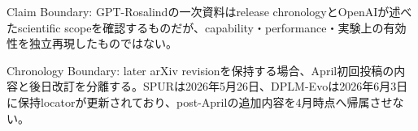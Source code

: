 \begin{claimboundary}
Claim Boundary: GPT-Rosalindの一次資料はrelease chronologyとOpenAIが述べたscientific scopeを確認するものだが、capability・performance・実験上の有効性を独立再現したものではない。\autocite{src-078f0d540d88}
\end{claimboundary}

\begin{claimboundary}
Chronology Boundary: later arXiv revisionを保持する場合、April初回投稿の内容と後日改訂を分離する。SPURは2026年5月26日、DPLM-Evoは2026年6月3日に保持locatorが更新されており、post-Aprilの追加内容を4月時点へ帰属させない。\autocite{src-7ae707d75c4b,src-f0bb84fcd319}
\end{claimboundary}
